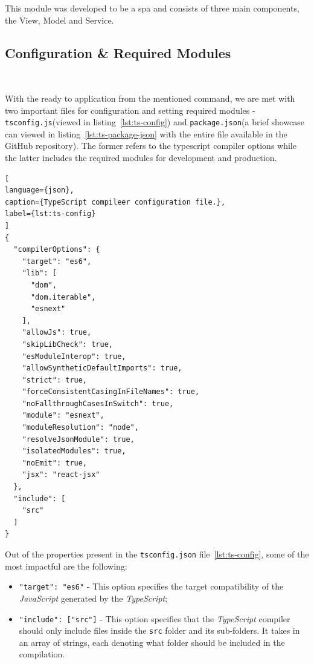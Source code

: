 This module was developed to be a \acrfull{spa} and consists of three main components, the View, Model and Service.

\subsection{Configuration \& Required Modules}~\label{ch:impl:sec:fe:subsec:config-and-modules}

With the ready to application from the mentioned command, we are met with two important files for configuration and setting required modules - \lstinline{tsconfig.js}(viewed in listing~\ref{lst:ts-config}) and \lstinline{package.json}(a brief showcase can viewed in listing~\ref{lst:ts-package-json} with the entire file available in the GitHub repository). The former refers to the typescript compiler options while the latter includes the required modules for development and production.

\begin{lstlisting}[
language={json},
caption={TypeScript compileer configuration file.},
label={lst:ts-config}
]
{
  "compilerOptions": {
    "target": "es6",
    "lib": [
      "dom",
      "dom.iterable",
      "esnext"
    ],
    "allowJs": true,
    "skipLibCheck": true,
    "esModuleInterop": true,
    "allowSyntheticDefaultImports": true,
    "strict": true,
    "forceConsistentCasingInFileNames": true,
    "noFallthroughCasesInSwitch": true,
    "module": "esnext",
    "moduleResolution": "node",
    "resolveJsonModule": true,
    "isolatedModules": true,
    "noEmit": true,
    "jsx": "react-jsx"
  },
  "include": [
    "src"
  ]
}
\end{lstlisting}


Out of the properties present in the \lstinline{tsconfig.json} file~\ref{lst:ts-config}, some of the most impactful are the following:
\begin{itemize}
    \item \lstinline[keywordstyle=\color{black},commentstyle=\color{black},stringstyle=\color{black}]{"target": "es6"} - This option specifies the target compatibility of the \textit{JavaScript} generated by the \textit{TypeScript};

    \item \lstinline[keywordstyle=\color{black},commentstyle=\color{black},stringstyle=\color{black}]{"include": ["src"]} - This option specifies that the \textit{TypeScript} compiler should only include files inside the \lstinline{src} folder and its sub-folders. It takes in an array of strings, each denoting what folder should be included in the compilation.
\end{itemize}


